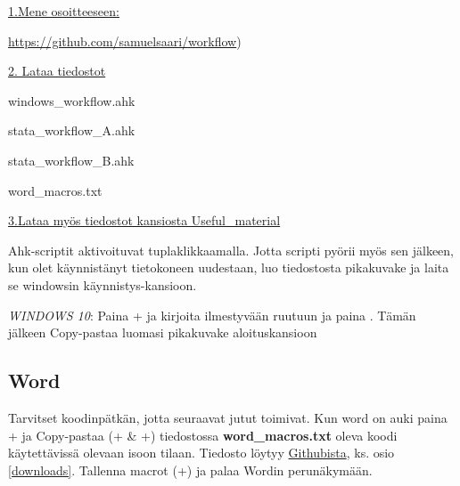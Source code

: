 \documentclass[a4paper,12pt]{scrartcl}
\newcommand*{\mybox}[1]{\framebox{#1}}
\begin{document}
\begin{framed}
	
	\underline{1.Mene osoitteeseen:}
	
	\url{https://github.com/samuelsaari/workflow})
	
	\medskip
	
	\underline{2. Lataa tiedostot}
	
	windows\_workflow.ahk
	
	stata\_workflow\_A.ahk
	
	stata\_workflow\_B.ahk
	
	word\_macros.txt
	
	\medskip
	
	\underline{3.Lataa myös tiedostot kansiosta Useful\_material}
	
	
	
\end{framed}


\medskip

Ahk-scriptit aktivoituvat tuplaklikkaamalla. Jotta scripti pyörii myös sen jälkeen, kun olet käynnistänyt tietokoneen uudestaan, luo tiedostosta pikakuvake ja laita se windowsin käynnistys-kansioon.

\medskip

\emph{WINDOWS 10}: Paina + ja kirjoita ilmestyvään ruutuun \mybox{shell::startup} ja paina \keys{\return}. Tämän jälkeen Copy-pastaa luomasi pikakuvake aloituskansioon

\medskip





\subsection{Word}
Tarvitset koodinpätkän, jotta seuraavat jutut toimivat. Kun word on auki paina + ja Copy-pastaa (+ \& +) tiedostossa \textbf{word\_macros.txt} oleva koodi käytettävissä olevaan isoon tilaan. Tiedosto löytyy \href{https://github.com/samuelsaari/workflow}{Githubista}, ks. osio \ref{downloads}. Tallenna macrot (+) ja palaa Wordin perunäkymään.
\end{document}
